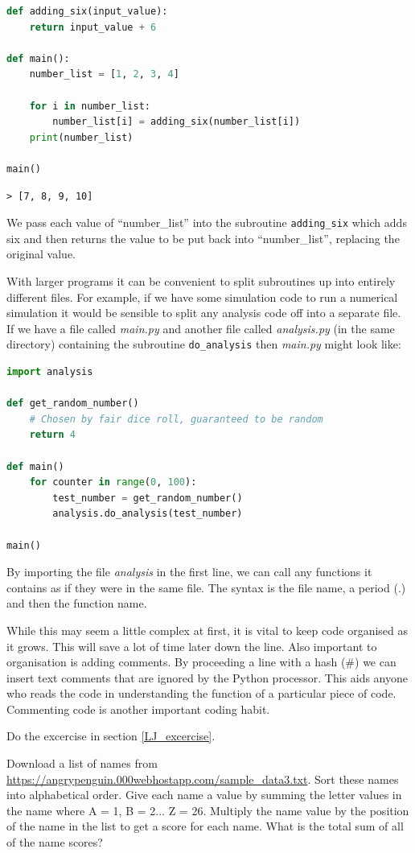 			\begin{lstlisting}[language=Python]
def adding_six(input_value):
	return input_value + 6

def main():
	number_list = [1, 2, 3, 4]
	
	for i in number_list:
		number_list[i] = adding_six(number_list[i])
	print(number_list)
			
main()\end{lstlisting}

			\begin{verbatim}> [7, 8, 9, 10]\end{verbatim}
			We pass each value of ``number\_list'' into the subroutine \texttt{adding\_six} which adds six and then returns the value to be put back into ``number\_list'', replacing the original value. 

			With larger programs it can be convenient to split subroutines up into entirely different files. For example, if we have some simulation code to run a numerical simulation it would be sensible to split any analysis code off into a separate file. If we have a file called \textit{main.py} and another file called \textit{analysis.py} (in the same directory) containing the subroutine \texttt{do\_analysis} then \textit{main.py} might look like:
\begin{lstlisting}[language=Python]
import analysis

def get_random_number()
	# Chosen by fair dice roll, guaranteed to be random
	return 4
	
def main()
	for counter in range(0, 100):
		test_number = get_random_number()
		analysis.do_analysis(test_number)
			
main()\end{lstlisting}
By importing the file \textit{analysis} in the first line, we can call any functions it contains as if they were in the same file. The syntax is the file name, a period (.) and then the function name.

While this may seem a little complex at first, it is vital to keep code organised as it grows. This will save a lot of time later down the line. Also important to organisation is adding comments. By proceeding a line with a hash (\#) we can insert text comments that are ignored by the Python processor. This aids anyone who reads the code in understanding the function of a particular piece of code. Commenting code is another important coding habit.
\begin{task}Do the excercise in section \ref{LJ_excercise}.\end{task}
\begin{advancedtask} Download a list of names from \url{https://angrypenguin.000webhostapp.com/sample_data3.txt}. Sort these names into alphabetical order. Give each name a value by summing the letter values in the name where A = 1, B = 2... Z = 26. Multiply the name value by the position of the name in the list to get a score for each name. What is the total sum of all of the name scores?\end{advancedtask}

